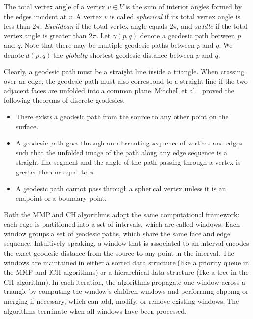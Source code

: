 The total vertex angle of a vertex $v\in V$ is the sum of interior
angles formed by the edges incident at $v$. A vertex $v$ is called
{\em spherical} if its total vertex angle is less than $2\pi$, {\em
Euclidean} if the total vertex angle equals $2\pi$, and {\em saddle}
if the total vertex angle is greater than $2\pi$. Let $\gamma(p,q)$
denote a geodesic path between $p$ and $q$. Note that there may be
multiple geodesic paths between $p$ and $q$. We denote $d(p,q)$ the
\textit{globally} shortest geodesic distance between $p$ and $q$.


Clearly, a geodesic path must be a straight line inside a triangle.
When crossing over an edge, the geodesic path must also correspond
to a straight line if the two adjacent faces are unfolded into a
common plane. Mitchell et al.~\cite{Mitchell_Etc:1987} proved
the following theorems of
 discrete geodesics.
\begin{itemize}
\item There exists a geodesic path from the source to any other point on the surface.
\item A geodesic path goes through an alternating sequence
of vertices and edges such that the unfolded image of the path along
any edge sequence is a straight line segment and the angle of the
path passing through a vertex is greater than or equal to $\pi$.
\item A geodesic path cannot pass through a
spherical vertex unless it is an endpoint or a boundary point.
\end{itemize}

 Both the MMP and CH algorithms adopt the same computational
framework: each edge is partitioned into a set of intervals, which
are called windows. Each window groups a set of geodesic paths,
which share the same face and edge sequence. Intuitively speaking, a
window that is associated to an interval encodes the exact geodesic
distance from the source to any point in the interval. The windows
are maintained in either a sorted data structure (like a priority
queue in the MMP and ICH algorithms) or a hierarchical data
structure (like a tree in the CH algorithm). In each iteration, the
algorithms propagate one window across a triangle by computing the
window's children windows and performing clipping or merging if
necessary, which can add, modify, or remove existing windows. The
algorithms terminate when all windows have been processed. \fi

